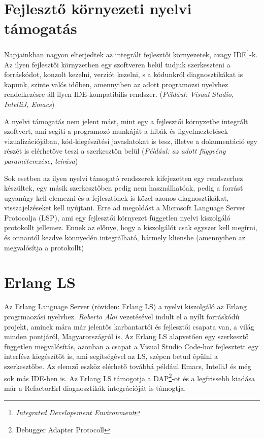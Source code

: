 \section{Fejlesztő környezeti nyelvi támogatás}
Napjainkban nagyon elterjedtek az integrált fejlesztői környezetek, avagy IDE\footnote{\textit{Integrated Developement Environment}}-k. Az ilyen fejlesztői környzetben egy szoftveren belül tudjuk szerkeszteni a forráskódot, konzolt kezelni, verziót kezelni, s a kódunkról diagnosztikákat is kapunk, szinte valós időben, amennyiben az adott programozsi nyelvhez rendelkezésre áll ilyen IDE-kompatibilis rendszer. (\textit{Például: Visual Studio, IntelliJ, Emacs})

A nyelvi támogatás nem jelent mást, mint egy a fejlesztői környzetbe integrált szoftvert, ami segíti a programozó munkáját a hibák és figyelmeztetések vizualizációjában, kód-kiegészítési javaslatokat is tesz, illetve a dokumentáció egy részét is elérhetőve teszi a szerkesztőn belül (\textit{Például: az adott függvény paraméterezése, leírása})

Sok esetben az ilyen nyelvi támogató rendszerek kifejezetten egy rendszerhez készültek, egy másik szerkesztőben pedig nem használhatóak, pedig a forrást ugyanúgy kell elemezni és a fejlesztőnek is közel azonos diagnosztikákat, visszajelzéseket kell nyújtani. Erre ad megoldást a Microsoft Language Server Protocolja (LSP), ami egy fejlesztői környezet független nyelvi kiszolgáló protokollt jellemez. Ennek az előnye, hogy a kiszolgálót csak egyszer kell megírni, és onnantól kezdve könnyedén integrálható, bármely kliensbe (amennyiben az megvalósítja a protokollt)

\section{Erlang LS}
Az Erlang Language Server (röviden: Erlang LS) a nyelvi kiszolgáló az Erlang progrmaozási nyelvhez. \textit{Roberto Aloi} vezetésével indult el a nyílt forráskódú projekt, aminek mára már jelentős karbantartói és fejlesztői csapata van, a világ minden pontjáról, Magyarországról is. Az Erlang LS alapvetően egy szerkesztő független megvalósítás, azonban a csapat a Visual Studio Code-hoz fejlesztett egy interfész kiegészítőt is, ami segítségével az LS, szépen betud épülni a szerkesztőbe. Az elemző eszköz elérhető továbbá például Emacs, IntelliJ és még sok más IDE-ben is. Az Erlang LS támogotja a DAP\footnote{Debugger Adapter Protocoll}-ot és a legfrissebb kiadása már a RefactorErl diagnosztikák integrációját is támogtja.

